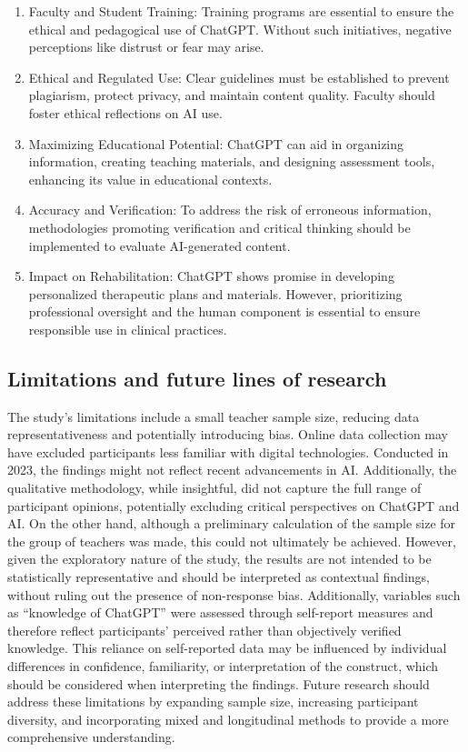 \documentclass[english]{textolivre}
\begin{document}
\begin{enumerate}
    \item Faculty and Student Training: Training programs are essential to ensure the ethical and pedagogical use of ChatGPT. Without such initiatives, negative perceptions like distrust or fear may arise.
    \item Ethical and Regulated Use: Clear guidelines must be established to prevent plagiarism, protect privacy, and maintain content quality. Faculty should foster ethical reflections on AI use.
    \item Maximizing Educational Potential: ChatGPT can aid in organizing information, creating teaching materials, and designing assessment tools, enhancing its value in educational contexts.
    \item Accuracy and Verification: To address the risk of erroneous information, methodologies promoting verification and critical thinking should be implemented to evaluate AI-generated content.
    \item Impact on Rehabilitation: ChatGPT shows promise in developing personalized therapeutic plans and materials. However, prioritizing professional oversight and the human component is essential to ensure responsible use in clinical practices.
\end{enumerate}

\subsection{Limitations and future lines of research}\label{sec-format-simple}
The study’s limitations include a small teacher sample size, reducing data representativeness and potentially introducing bias. Online data collection may have excluded participants less familiar with digital technologies. Conducted in 2023, the findings might not reflect recent advancements in AI. Additionally, the qualitative methodology, while insightful, did not capture the full range of participant opinions, potentially excluding critical perspectives on ChatGPT and AI. On the other hand, although a preliminary calculation of the sample size for the group of teachers was made, this could not ultimately be achieved. However, given the exploratory nature of the study, the results are not intended to be statistically representative and should be interpreted as contextual findings, without ruling out the presence of non-response bias. Additionally, variables such as “knowledge of ChatGPT” were assessed through self-report measures and therefore reflect participants’ perceived rather than objectively verified knowledge. This reliance on self-reported data may be influenced by individual differences in confidence, familiarity, or interpretation of the construct, which should be considered when interpreting the findings. Future research should address these limitations by expanding sample size, increasing participant diversity, and incorporating mixed and longitudinal methods to provide a more comprehensive understanding.
\end{document}
